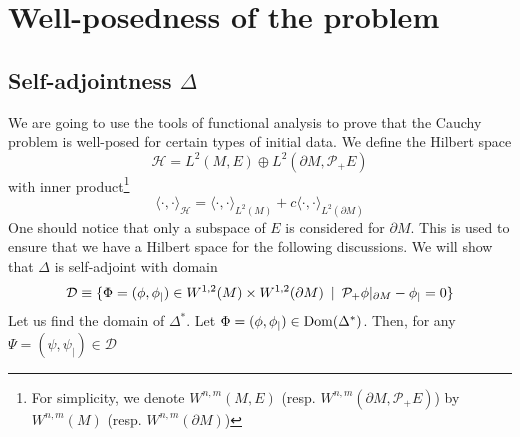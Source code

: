 \section{Well-posedness of the problem}\label{wen-sect-saw}
\subsection{Self-adjointness $\Delta$}
We are going to use the tools of functional analysis to prove that the Cauchy problem is well-posed for certain types of initial data.
We define the Hilbert space 
\begin{equation*}
\mathcal{H} = L^{2}(M,E)\oplus L^{2}(\partial M, \mathcal{P}_+ E)
\end{equation*}
with inner product\footnote{
For simplicity,
we denote $W^{n,m}(M,E)$ (resp. $W^{n,m}(\partial M, \mathcal{P}_+E)$) by $W^{n,m}(M)$ (resp. $W^{n,m}(\partial M)$)}
\begin{equation}\label{wen-innerpdt}
\langle \cdot, \cdot \rangle _\mathcal{H} = \langle \cdot, \cdot \rangle _{L^2(M)} + c \langle \cdot, \cdot \rangle _{L^2(\partial M)}
\end{equation}
One should notice that only a subspace of $E$ is considered for $\partial M$.
This is used to ensure that we have a Hilbert space for the following discussions.
We will show that $\Delta$ is self-adjoint with domain\begin{equation*}
\mathcal{D} \equiv \{ \Phi = (\phi, \phi_|) \in W^{1,2}(M)\times W^{1,2}(
\partial M)\enskip | \enskip \mathcal{P}_+\phi \vert_{\partial M} - \phi_| = 0 \}
\end{equation*}
Let us find the domain of $\Delta^*$.  
Let $\Phi = (\phi, \phi_|) \in \mathrm{Dom}(\Delta^*)$.
Then, for any $ \Psi = (\psi, \psi_|)\in\mathcal{D}$
